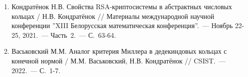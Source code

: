 \documentclass[_00_autoref.tex]{subfiles}
\begin{document}
\begin{enumerate}
    \item \label{source:XIII_Belarussian_math_conference_2021}
    Кондратёнок Н.В. Свойства RSA-криптосистемы в абстрактных числовых кольцах / Н.В. Кондратёнок // Материалы международной научной конференции ''XIII Белорусская математическая конференция''.~--- Ноябрь 22-25, 2021.~--- Часть~2.~--- С.~63-64.

    \item \label{source:CSIST_2022}
    Васьковский М.М. Аналог критерия Миллера в дедекиндовых кольцах с конечной нормой / М.М. Васьковский, Н.В. Кондратёнок // CSIST.~--- 2022.~--- С.~1-7.

\end{enumerate}

\end{document}
